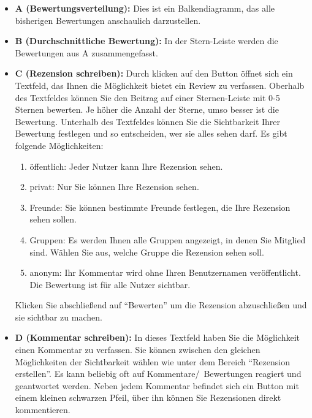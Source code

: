 \begin{enumerate}
    \begin{itemize} 
        \item \textbf{A (Bewertungsverteilung):} Dies ist ein Balkendiagramm, das alle bisherigen Bewertungen anschaulich darzustellen. %
        \item \textbf{B (Durchschnittliche Bewertung):} In der Stern-Leiste  werden die Bewertungen aus A zusammengefasst.
        \item \textbf{C (Rezension schreiben):} Durch klicken auf den Button öffnet sich ein Textfeld, das Ihnen die Möglichkeit bietet ein Review  zu verfassen. Oberhalb des Textfeldes können Sie den Beitrag auf einer Sternen-Leiste mit 0-5 Sternen bewerten. Je höher die Anzahl der Sterne, umso besser ist die Bewertung. Unterhalb des Textfeldes können Sie die Sichtbarkeit Ihrer Bewertung festlegen und so entscheiden, wer sie alles sehen darf. Es gibt folgende Möglichkeiten:
        \begin{enumerate}
            \item öffentlich: Jeder Nutzer kann Ihre Rezension sehen.
            \item privat: Nur Sie können Ihre Rezension sehen.
            \item Freunde: Sie können bestimmte Freunde festlegen, die Ihre Rezension sehen sollen.
            \item Gruppen: Es werden Ihnen alle Gruppen angezeigt, in denen Sie Mitglied sind. Wählen Sie aus, welche Gruppe die Rezension sehen soll.
            \item anonym: Ihr Kommentar wird ohne Ihren Benutzernamen veröffentlicht. Die Bewertung ist für alle Nutzer sichtbar.
        \end{enumerate}
       	Klicken Sie abschließend auf \enquote{Bewerten} um die Rezension abzuschließen und sie sichtbar zu machen.
        \item \textbf{D (Kommentar schreiben):} In dieses Textfeld haben Sie die Möglichkeit einen Kommentar zu verfassen. Sie können zwischen den gleichen Möglichkeiten der Sichtbarkeit wählen wie unter dem Bereich \enquote{Rezension erstellen}.
\newline Es kann beliebig oft auf Kommentare/~Bewertungen reagiert und geantwortet werden. Neben jedem Kommentar befindet sich ein Button mit einem kleinen schwarzen Pfeil, über ihn können Sie Rezensionen direkt kommentieren. 
    \end{itemize}
\end{enumerate}